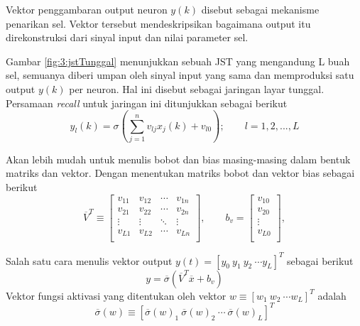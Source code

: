 Vektor penggambaran output neuron $y(k)$ disebut sebagai mekanisme penarikan sel. Vektor tersebut mendeskripsikan bagaimana output itu direkonstruksi dari sinyal input dan nilai parameter sel.

Gambar \ref{fig:3:jstTunggal} menunjukkan sebuah JST yang mengandung L buah sel, semuanya diberi umpan oleh sinyal input yang sama dan memproduksi satu output $y(k)$ per neuron. Hal ini disebut sebagai jaringan layar tunggal. Persamaan \textit{recall} untuk jaringan ini ditunjukkan sebagai berikut
\vspace{0em}
\begin{equation} \label{eq:3:recall}
y_l(k) = \sigma \left( \sum_{j=1}^{n}v_{lj}x_j(k)+v_{l0} \right); \qquad l = 1,2,...,L
\end{equation}

Akan lebih mudah untuk menulis bobot dan bias masing-masing dalam bentuk matriks dan vektor. Dengan menentukan matriks bobot dan vektor bias sebagai berikut
\vspace{-1em}
\begin{equation} \label{eq:3:weightVector}
\overline{V}^T \equiv
\left[
\begin{matrix}
v_{11} & v_{12} & \cdots & v_{1n} \\
v_{21} & v_{22} & \cdots & v_{2n} \\
\vdots & \vdots & \ddots & \vdots \\
v_{L1} & v_{L2} & \cdots & v_{Ln} \\
\end{matrix}
\right], \qquad
b_v = 
\left[
\begin{matrix}
v_{10} \\
v_{20} \\
\vdots \\
v_{L0} \\
\end{matrix}
\right],
\end{equation}

\noindent Salah satu cara menulis vektor output $y(t) = [y_0\ y_1\ y_2\ \cdots y_L]^T$ sebagai berikut
\vspace{-1em}
\begin{equation} \label{eq:3:outputVector}
y = \overline{\sigma}(\overline{V}^T\overline{x}+b_v)
\end{equation}
\noindent Vektor fungsi aktivasi yang ditentukan oleh vektor $w\equiv [w_1\ w_2\ \cdots w_L]^T$ adalah
\vspace{-1em}
\begin{equation} \label{eq:3:activation}
\overline{\sigma}(w)\equiv [\overline{\sigma}(w)_1\ \overline{\sigma}(w)_2\ \cdots\ \overline{\sigma}(w)_L]^T
\end{equation}

